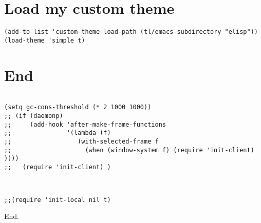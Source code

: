 \documentclass[12pt]{article}
\begin{document}
\section{Load my custom theme}
\label{sec:org0bc3286}

\begin{verbatim}
(add-to-list 'custom-theme-load-path (tl/emacs-subdirectory "elisp"))
(load-theme 'simple t)
\end{verbatim}

\section{End}
\label{sec:org47faf77}

\begin{verbatim}

(setq gc-cons-threshold (* 2 1000 1000))
;; (if (daemonp)
;;     (add-hook 'after-make-frame-functions
;;               '(lambda (f)
;;                  (with-selected-frame f
;;                    (when (window-system f) (require 'init-client) ))))
;;   (require 'init-client) )



\end{verbatim}


\begin{verbatim}
;;(require 'init-local nil t)
\end{verbatim}



End.
\end{document}
